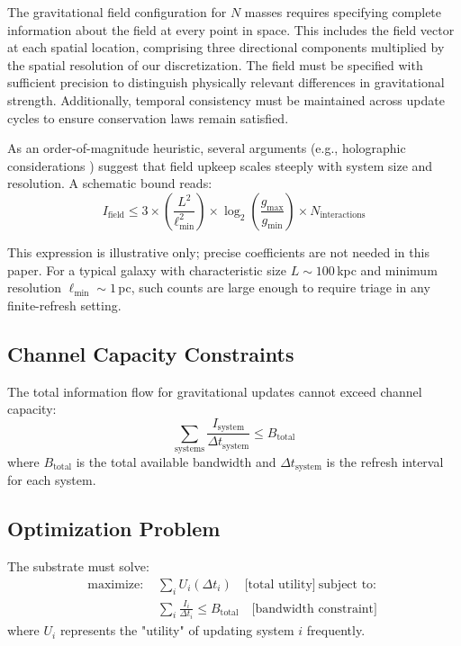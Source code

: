 \documentclass[usenatbib]{mnras}
\begin{document}
The gravitational field configuration for $N$ masses requires specifying complete information about the field at every point in space. This includes the field vector at each spatial location, comprising three directional components multiplied by the spatial resolution of our discretization. The field must be specified with sufficient precision to distinguish physically relevant differences in gravitational strength. Additionally, temporal consistency must be maintained across update cycles to ensure conservation laws remain satisfied.

As an order-of-magnitude heuristic, several arguments (e.g., holographic considerations \citep{bekenstein1973, thooft1993}) suggest that field upkeep scales steeply with system size and resolution. A schematic bound reads:
\begin{equation}
I_{\text{field}} \leq 3 \times \left(\frac{L^2}{\ell_{\text{min}}^2}\right) \times \log_2\left(\frac{g_{\text{max}}}{g_{\text{min}}}\right) \times N_{\text{interactions}}
\end{equation}

This expression is illustrative only; precise coefficients are not needed in this paper. For a typical galaxy with characteristic size $L \sim 100$\,kpc and minimum resolution $\ell_{\text{min}} \sim 1$\,pc, such counts are large enough to require triage in any finite-refresh setting.

\subsection{Channel Capacity Constraints}

The total information flow for gravitational updates cannot exceed channel capacity:
\begin{equation}
\sum_{\text{systems}} \frac{I_{\text{system}}}{\Delta t_{\text{system}}} \leq B_{\text{total}}
\end{equation}
where $B_{\text{total}}$ is the total available bandwidth and $\Delta t_{\text{system}}$ is the refresh interval for each system.

\subsection{Optimization Problem}

The substrate must solve:
\begin{align}
\text{maximize: } & \sum_i U_i(\Delta t_i) \quad \text{[total utility]} \
\text{subject to: }\\ & \sum_i \frac{I_i}{\Delta t_i} \leq B_{\text{total}} \quad \text{[bandwidth constraint]}
\end{align}
where $U_i$ represents the "utility" of updating system $i$ frequently.
\end{document}
